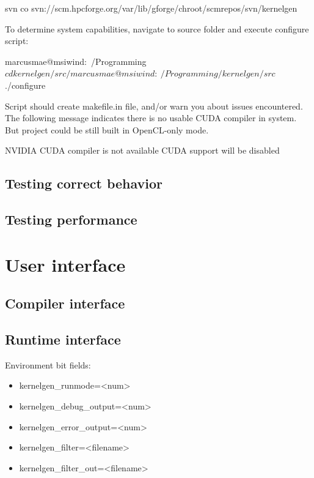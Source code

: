 \documentclass[a4,12pt]{article}
\begin{document}
\begin{code}
svn co svn://scm.hpcforge.org/var/lib/gforge/chroot/scmrepos/svn/kernelgen
\end{code}

To determine system capabilities, navigate to source folder and execute configure script: 

\begin{code}
marcusmae@msiwind:~/Programming$ cd kernelgen/src/
marcusmae@msiwind:~/Programming/kernelgen/src$ ./configure
\end{code}

Script should create makefile.in file, and/or warn you about issues encountered. The following message indicates there is no usable CUDA compiler in system. But project could be still built in OpenCL-only mode. 

\begin{code}
NVIDIA CUDA compiler is not available
CUDA support will be disabled
\end{code}

\subsection{Testing correct behavior}

\subsection{Testing performance}

\section{User interface}

\subsection{Compiler interface}

\subsection{Runtime interface}

Environment bit fields:

\begin{itemize}
\item kernelgen\_runmode=<num>
\item kernelgen\_debug\_output=<num>
\item kernelgen\_error\_output=<num>
\item kernelgen\_filter=<filename>
\item kernelgen\_filter\_out=<filename>
\end{itemize}
\end{document}
